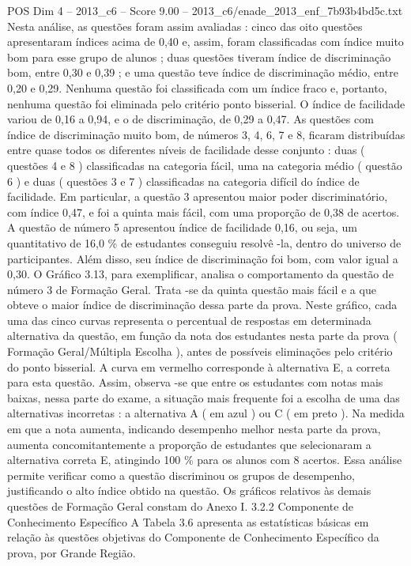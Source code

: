 \begin{textsample}{POS Dim 4 – 2013\_c6 – Score 9.00 – 2013\_c6/enade\_2013\_enf\_7b93b4bd5c.txt}
Nesta análise, as questões foram assim avaliadas : cinco das oito questões apresentaram índices acima de 0,40 e, assim, foram classificadas com índice muito bom para esse grupo de alunos ; duas questões tiveram índice de discriminação bom, entre 0,30 e 0,39 ; e uma questão teve índice de discriminação médio, entre 0,20 e 0,29.
Nenhuma questão foi classificada com um índice fraco e, portanto, nenhuma questão foi eliminada pelo critério ponto bisserial.
O índice de facilidade variou de 0,16 a 0,94, e o de discriminação, de 0,29 a 0,47.
As questões com índice de discriminação muito bom, de números 3, 4, 6, 7 e 8, ficaram distribuídas entre quase todos os diferentes níveis de facilidade desse conjunto : duas ( questões 4 e 8 ) classificadas na categoria fácil, uma na categoria médio ( questão 6 ) e duas ( questões 3 e 7 ) classificadas na categoria difícil do índice de facilidade.
Em particular, a questão 3 apresentou maior poder discriminatório, com índice 0,47, e foi a quinta mais fácil, com uma proporção de 0,38 de acertos.
A questão de número 5 apresentou índice de facilidade 0,16, ou seja, um quantitativo de 16,0 \% de estudantes conseguiu resolvê -la, dentro do universo de participantes.
Além disso, seu índice de discriminação foi bom, com valor igual a 0,30.
O Gráfico 3.13, para exemplificar, analisa o comportamento da questão de número 3 de Formação Geral.
Trata -se da quinta questão mais fácil e a que obteve o maior índice de discriminação dessa parte da prova.
Neste gráfico, cada uma das cinco curvas representa o percentual de respostas em determinada alternativa da questão, em função da nota dos estudantes nesta parte da prova ( Formação Geral/Múltipla Escolha ), antes de possíveis eliminações pelo critério do ponto bisserial.
A curva em vermelho corresponde à alternativa E, a correta para esta questão.
Assim, observa -se que entre os estudantes com notas mais baixas, nessa parte do exame, a situação mais frequente foi a escolha de uma das alternativas incorretas : a alternativa A ( em azul ) ou C ( em preto ).
Na medida em que a nota aumenta, indicando desempenho melhor nesta parte da prova, aumenta concomitantemente a proporção de estudantes que selecionaram a alternativa correta E, atingindo 100 \% para os alunos com 8 acertos.
Essa análise permite verificar como a questão discriminou os grupos de desempenho, justificando o alto índice obtido na questão.
Os gráficos relativos às demais questões de Formação Geral constam do Anexo I. 3.2.2 Componente de Conhecimento Específico A Tabela 3.6 apresenta as estatísticas básicas em relação às questões objetivas do Componente de Conhecimento Específico da prova, por Grande Região.

\end{textsample}
